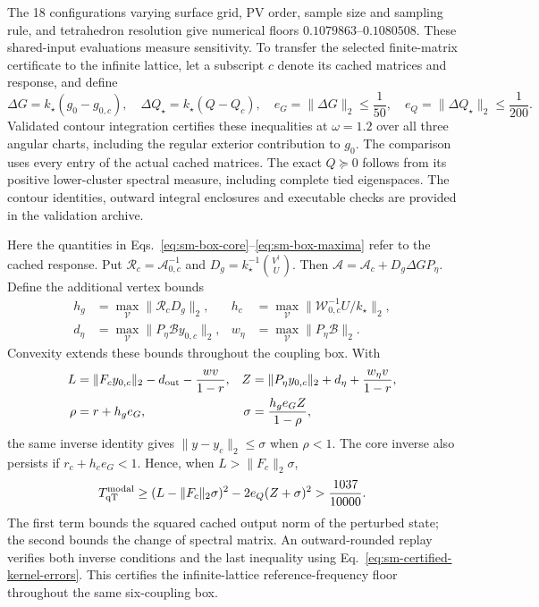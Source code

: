 \documentclass[10pt,aps,onecolumn,notitlepage,nofootinbib]{revtex4-2}
\newcommand{\qT}{\mathrm{qT}}
\begin{document}
The 18 configurations varying surface grid, PV order, sample size and sampling rule, and tetrahedron resolution give numerical floors $0.1079863$--$0.1080508$. These shared-input evaluations measure sensitivity. To transfer the selected finite-matrix certificate to the infinite lattice, let a subscript $c$ denote its cached matrices and response, and define
\begin{equation}
 \Delta G=k_\star(g_0-g_{0,c}),\quad
 \Delta Q_\star=k_\star(Q-Q_c),\quad
 e_G=\|\Delta G\|_2\leq\frac1{50},\quad
 e_Q=\|\Delta Q_\star\|_2\leq\frac1{200}.
 \label{eq:sm-certified-kernel-errors}
\end{equation}
Validated contour integration certifies these inequalities at $\omega=1.2$ over all three angular charts, including the regular exterior contribution to $g_0$. The comparison uses every entry of the actual cached matrices. The exact $Q\succeq0$ follows from its positive lower-cluster spectral measure, including complete tied eigenspaces. The contour identities, outward integral enclosures and executable checks are provided in the validation archive.

Here the quantities in Eqs.~\eqref{eq:sm-box-core}--\eqref{eq:sm-box-maxima} refer to the cached response. Put $\mathcal R_c=\mathcal A_{0,c}^{-1}$ and $D_g=k_\star^{-1}\binom{V^\dagger}{U}$. Then $\mathcal A=\mathcal A_c+D_g\Delta G P_\eta$. Define the additional vertex bounds
\begin{align}
 h_g&=\max_{\mathcal V}\|\mathcal R_cD_g\|_2,&
 h_c&=\max_{\mathcal V}\|\mathcal W_{0,c}^{-1}U/k_\star\|_2,\\
 d_\eta&=\max_{\mathcal V}\|P_\eta\mathcal B y_{0,c}\|_2,&
 w_\eta&=\max_{\mathcal V}\|P_\eta\mathcal B\|_2.
\end{align}
Convexity extends these bounds throughout the coupling box. With
\begin{align}
 L&=\|F_cy_{0,c}\|_2-d_{\rm out}-\frac{wv}{1-r},&
 Z&=\|P_\eta y_{0,c}\|_2+d_\eta+\frac{w_\eta v}{1-r},\\
 \rho&=r+h_ge_G,&
 \sigma&=\frac{h_ge_G Z}{1-\rho},
\end{align}
the same inverse identity gives $\|y-y_c\|_2\leq\sigma$ when $\rho<1$. The core inverse also persists if $r_c+h_ce_G<1$. Hence, when $L>\|F_c\|_2\sigma$,
\begin{equation}
 T_{\qT}^{\rm modal}\geq
 (L-\|F_c\|_2\sigma)^2-2e_Q(Z+\sigma)^2
 >\frac{1037}{10000}.
 \label{eq:sm-certified-lattice-floor}
\end{equation}
The first term bounds the squared cached output norm of the perturbed state; the second bounds the change of spectral matrix. An outward-rounded replay verifies both inverse conditions and the last inequality using Eq.~\eqref{eq:sm-certified-kernel-errors}. This certifies the infinite-lattice reference-frequency floor throughout the same six-coupling box.
\end{document}
